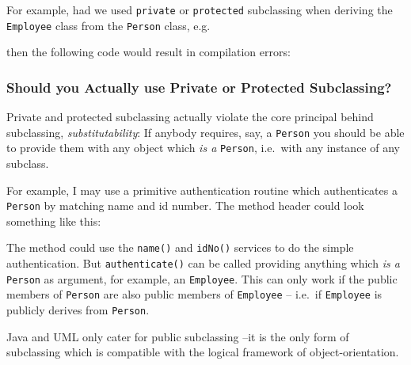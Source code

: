 For example, had we used \verb+private+ or \verb+protected+ subclassing when 
deriving the \verb+Employee+ class from the \verb+Person+ class, e.g.\


\noindent
then the following code would result in compilation errors:



\subsubsection{Should you Actually use Private or Protected Subclassing?}

Private and protected subclassing actually violate the core principal behind
subclassing, {\em substitutability}: If anybody requires, say, a \verb+Person+
you should be able to provide them with any object which {\em is a} 
\verb+Person+, i.e.\ with any instance of any subclass.

For example, I may use a primitive authentication routine which authenticates
a \verb+Person+ by matching name and id number. The method header could look 
something like this:


The method could use the \verb+name()+ and \verb+idNo()+ services to do the
simple authentication. But \verb+authenticate()+ can be called providing 
anything which {\em is a} \verb+Person+ as argument, for example, an
\verb+Employee+. This can only work if the public members of \verb+Person+
are also public members of \verb+Employee+ -- i.e.\ if \verb+Employee+ is
publicly derives from \verb+Person+.

Java and UML only cater for public subclassing --it is the only form of 
subclassing which is compatible with the logical framework of 
object-orientation.


